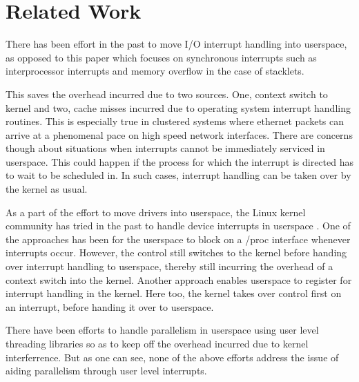 \section{Related Work}

There has been effort in the past to move I/O interrupt handling into userspace,
\cite{parker} as opposed to this paper which focuses on synchronous interrupts such as
interprocessor interrupts and memory overflow in the case of stacklets. 

This saves the overhead incurred due to two sources. One, context switch to
kernel and two, cache misses incurred due to operating system interrupt handling
routines. This is especially true in clustered systems where ethernet packets
can arrive at a phenomenal pace on high speed network interfaces. There are
concerns though about situations when interrupts cannot be immediately serviced
in userspace.  This could happen if the process for which the interrupt is
directed has to wait to be scheduled in. In such cases, interrupt handling can
be taken over by the kernel as usual.

As a part of the effort to move drivers into userspace, the Linux kernel
community has tried in the past to handle device interrupts in userspace \cite{website:lkml}. One of
the approaches has been for the userspace to block on a /proc interface whenever
interrupts occur. However, the control still switches to the kernel before
handing over interrupt handling to userspace, thereby still incurring the
overhead of a context switch into the kernel. Another approach enables userspace
to register for interrupt handling in the kernel. Here too, the kernel takes
over control first on an interrupt, before handing it over to userspace.

There have been efforts to handle parallelism in userspace using user level
threading libraries so as to keep off the overhead incurred due to kernel
interferrence. But as one can see, none of the above efforts address the issue
of aiding parallelism through user level interrupts.
